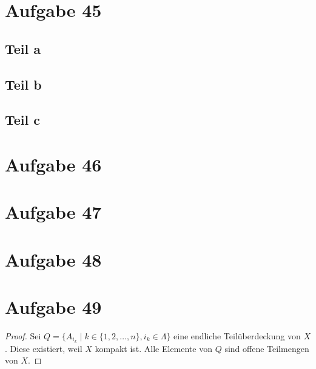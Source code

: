\documentclass[10pt,a4paper]{article}
\begin{document}
\section{Aufgabe 45}

\subsection{Teil a}

\subsection{Teil b}

\subsection{Teil c}

\section{Aufgabe 46}

\section{Aufgabe 47}

\section{Aufgabe 48}

\section{Aufgabe 49}

\begin{proof}
  Sei $Q = \{ A_{i_{k}} \mid k \in \{ 1, 2, \dots, n \}, i_{k} \in \Lambda \}$ eine endliche Teilüberdeckung von $X$.
  Diese existiert, weil $X$ kompakt ist.
  Alle Elemente von $Q$ sind offene Teilmengen von $X$.
\end{proof}
\end{document}
